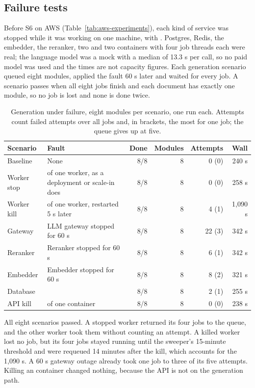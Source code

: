 \subsection{Failure tests}\label{sec:results-failure}
Before S6 on AWS (Table~\ref{tab:aws-experiments}), each kind of service was stopped while it was working on one machine, with . Postgres, Redis, the embedder, the reranker, two  and two  containers with four job threads each were real; the language model was a mock with a median of 13.3 s per call, so no paid model was used and the times are not capacity figures. Each generation scenario queued eight modules, applied the fault 60 s later and waited for every job. A scenario passes when all eight jobs finish and each document has exactly one module, so no job is lost and none is done twice.
\begin{table}[H]\centering\small\caption{Generation under failure, eight modules per scenario, one run each. Attempts count failed attempts over all jobs and, in brackets, the most for one job; the queue gives up at five.}\label{tab:failure-gen}
\begin{tabularx}{\linewidth}{|p{2.6cm}|Y|r|r|r|r|}\hline
Scenario & Fault & Done & Modules & Attempts & Wall\\\hline
Baseline & None & 8/8 & 8 & 0 (0) & 240 s\\\hline
Worker stop &  of one worker, as a deployment or scale-in does & 8/8 & 8 & 0 (0) & 258 s\\\hline
Worker kill &  of one worker, restarted 5 s later & 8/8 & 8 & 4 (1) & 1,090 s\\\hline
Gateway & LLM gateway stopped for 60 s & 8/8 & 8 & 22 (3) & 342 s\\\hline
Reranker & Reranker stopped for 60 s & 8/8 & 8 & 6 (1) & 342 s\\\hline
Embedder & Embedder stopped for 60 s & 8/8 & 8 & 8 (2) & 321 s\\\hline
Database &  & 8/8 & 8 & 2 (1) & 255 s\\\hline
API kill &  of one  container & 8/8 & 8 & 0 (0) & 238 s\\\hline
\end{tabularx}\end{table}
All eight scenarios passed. A stopped worker returned its four jobs to the queue, and the other worker took them without counting an attempt. A killed worker lost no job, but its four jobs stayed running until the sweeper's 15-minute threshold and were requeued 14 minutes after the kill, which accounts for the 1,090 s. A 60 s gateway outage already took one job to three of its five attempts. Killing an  container changed nothing, because the API is not on the generation path.

